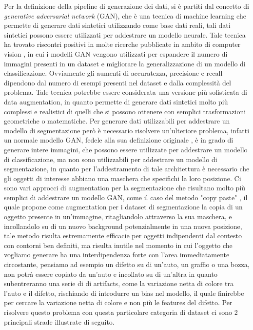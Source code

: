Per la definizione della pipeline di generazione dei dati, si è partiti dal concetto di \textit{generative adversarial network} (GAN), che è una tecnica di machine learning
che permette di generare dati sintetici utilizzando come base dati reali, tali dati sintetici possono essere utilizzati per addestrare un modello neurale.
Tale tecnica ha trovato riscontri positivi in molte ricerche pubblicate in ambito di computer vision \cite{ganbasedaugexample} , in cui i modelli GAN vengono
utilizzati per espandere il numero di immagini presenti in un dataset e migliorare la generalizzazione di un modello di classificazione.
Ovviamente gli aumenti di accuratezza, precisione e recall dipendono dal numero di esempi presenti nel dataset e dalla complessità del problema.
Tale tecnica potrebbe essere considerata una versione più sofisticata di data augmentation, in quanto permette di generare dati sintetici molto più complessi
e realistici di quelli che si possono ottenere con semplici trasformazioni geometriche o matematiche.
Per generare dati utilizzabili per addestrare un modello di segmentazione però è necessario risolvere un'ulteriore problema,
infatti un normale modello GAN, fedele alla sua definizione originale \cite{goodfellow2014generative} , è in grado di generare intere immagini,
che possono essere utilizzate per addestrare un modello di classificazione, ma non sono utilizzabili per addestrare un modello di segmentazione,
in quanto per l'addestramento di tale architettura è necessario che gli oggetti di interesse abbiano una maschera che specifichi la loro posizione.
Ci sono vari approcci di augmentation per la segmentazione che risultano molto più semplici di addestrare un modello GAN, come il caso del metodo "copy paste" \cite{ghiasi2021simple},
il quale propone come augmentation per i dataset di segmentazione la copia di un oggetto presente in un'immagine, ritagliandolo attraverso la sua maschera,
e incollandolo su di un nuovo background potenzialmente in una nuova posizione, tale metodo risulta estremamente efficacie per oggetti indipendenti dal contesto con contorni ben definiti,
ma risulta inutile nel momento in cui l'oggetto che vogliamo generare ha una interdipendenza forte con l'area immediatamente circostante,
pensiamo ad esempio un difetto su di un'auto, un graffio o una bozza, non potrà essere copiato da un'auto e incollato su di un'altra in quanto subentreranno una serie di
di artifacts, come la variazione netta di colore tra l'auto e il difetto, rischiando di introdurre un bias nel modello, il quale finirebbe per cercare la variazione netta di colore
e non più le features del difetto. Per risolvere questo problema con questa particolare categoria di dataset ci sono 2 principali strade illustrate di seguito.

